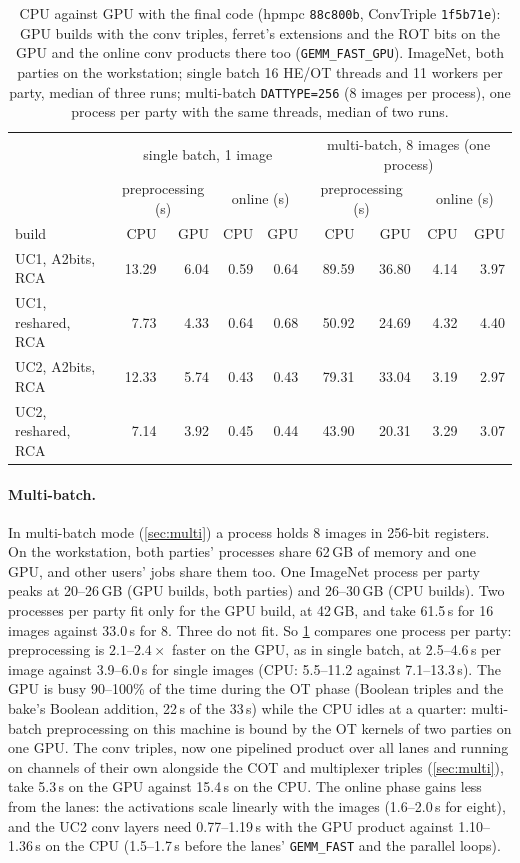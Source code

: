 \documentclass[10pt,a4paper]{article}
\newcommand{\flag}[1]{\nolinkurl{#1}}
\newcommand{\s}{\,s\xspace}
\begin{document}
\begin{table}[t]
\centering\small
\begin{tabular}{@{}lrrrrrrrr@{}}
\toprule
& \multicolumn{4}{c}{single batch, 1 image} & \multicolumn{4}{c}{multi-batch, 8 images (one process)}\\
& \multicolumn{2}{c}{preprocessing (s)} & \multicolumn{2}{c}{online (s)} & \multicolumn{2}{c}{preprocessing (s)} & \multicolumn{2}{c}{online (s)}\\
build & CPU & GPU & CPU & GPU & CPU & GPU & CPU & GPU\\
\midrule
UC1, A2bits, RCA & 13.29 & 6.04 & 0.59 & 0.64 & 89.59 & 36.80 & 4.14 & 3.97\\
UC1, reshared, RCA & 7.73 & 4.33 & 0.64 & 0.68 & 50.92 & 24.69 & 4.32 & 4.40\\
UC2, A2bits, RCA & 12.33 & 5.74 & 0.43 & 0.43 & 79.31 & 33.04 & 3.19 & 2.97\\
UC2, reshared, RCA & 7.14 & 3.92 & 0.45 & 0.44 & 43.90 & 20.31 & 3.29 & 3.07\\
\bottomrule
\end{tabular}
\caption{CPU against GPU with the final code (hpmpc \texttt{88c800b}, ConvTriple \texttt{1f5b71e}): GPU
builds with the conv triples, ferret's extensions and the ROT bits on the GPU and the online conv products there too
(\flag{GEMM_FAST_GPU}). ImageNet, both parties on the workstation; single batch 16 HE/OT threads and 11 workers per party,
median of three runs; multi-batch \flag{DATTYPE=256} (8 images per process), one process per party with the same threads,
median of two runs.}
\label{tab:gpumb}
\end{table}

\paragraph{Multi-batch.} In multi-batch mode (\cref{sec:multi}) a process holds 8 images in 256-bit registers. On the
workstation, both parties' processes share 62\,GB of memory and one GPU, and other users' jobs share them too. One
ImageNet process per party peaks at 20--26\,GB (GPU builds, both parties) and 26--30\,GB (CPU builds). Two processes per party fit
only for the GPU build, at 42\,GB, and take 61.5\s for 16 images against 33.0\s for 8. Three do not fit. So
\cref{tab:gpumb} compares one process per party: preprocessing is $2.1$--$2.4\times$ faster on the GPU, as in single
batch, at 2.5--4.6\s per image against 3.9--6.0\s for single images (CPU: 5.5--11.2 against 7.1--13.3\s). The GPU is busy 90--100\% of the time during
the OT phase (Boolean triples and the bake's Boolean addition, 22\s of the 33\s) while the CPU idles at a quarter:
multi-batch preprocessing on this machine is bound by the OT kernels of two parties on one GPU. The conv triples, now
one pipelined product over all lanes and running on channels of their own alongside the COT and multiplexer triples
(\cref{sec:multi}), take 5.3\s on the GPU against 15.4\s on the CPU. The online phase gains less from the lanes: the
activations scale linearly with the images (1.6--2.0\s for eight), and the UC2 conv layers need 0.77--1.19\s with the
GPU product against 1.10--1.36\s on the CPU (1.5--1.7\s before the lanes' \flag{GEMM_FAST} and the parallel loops).
\end{document}
